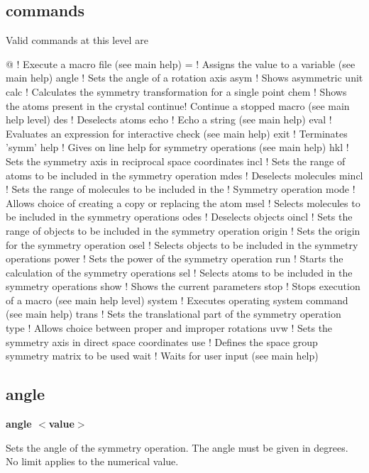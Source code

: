 \subsection*{commands}
Valid commands at this level are 
\par
\begin{MacVerbatim}
@       ! Execute a macro file (see main help)
=       ! Assigns the value to a variable (see main help)
angle   ! Sets the angle of a rotation axis
asym    ! Shows asymmetric unit
calc    ! Calculates the symmetry transformation for a single point
chem    ! Shows the atoms present in the crystal
continue! Continue a stopped macro (see main help level)
des     ! Deselects atoms
echo    ! Echo a string (see main help)
eval    ! Evaluates an expression for interactive check (see main help)
exit    ! Terminates 'symm'
help    ! Gives on line help for symmetry operations (see main help)
hkl     ! Sets the symmetry axis in reciprocal space coordinates
incl    ! Sets the range of atoms to be included in the symmetry operation
mdes    ! Deselects molecules
mincl   ! Sets the range of molecules to be included in the
        ! Symmetry operation
mode    ! Allows choice of creating a copy or replacing the atom
msel    ! Selects molecules to be included in the symmetry operations
odes    ! Deselects objects
oincl   ! Sets the range of objects to be included in the symmetry operation
origin  ! Sets the origin for the symmetry operation
osel    ! Selects objects to be included in the symmetry operations
power   ! Sets the power of the symmetry operation
run     ! Starts the calculation of the symmetry operations
sel     ! Selects atoms to be included in the symmetry operations
show    ! Shows the current parameters
stop    ! Stops execution of a macro (see main help level)
system  ! Executes operating system command (see main help)
trans   ! Sets the translational part of the symmetry operation
type    ! Allows choice between proper and improper rotations
uvw     ! Sets the symmetry axis in direct space coordinates
use     ! Defines the space group symmetry matrix to be used
wait    ! Waits for user input (see main help)
\end{MacVerbatim}
\subsection*{angle}
{\bf angle $ <$value$> $ \par }
\par
\vspace{3pt}
Sets the angle of the symmetry operation. The angle must be given in 
degrees. No limit applies to the numerical value. 
